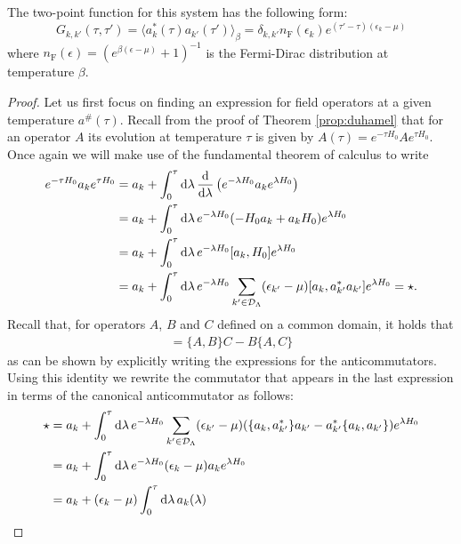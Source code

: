 \begin{lemma}
	\label{two-point-function}
	The two-point function for this system has the following form:
	\begin{equation}
		G_{k,k'}(\tau,\tau')
		= \langle a^*_k(\tau) a_{k'}(\tau') \rangle_\beta
		= \delta_{k,k'} n_{\mathrm{F}}(\epsilon_k) e^{(\tau'-\tau)(\epsilon_{k}-\mu)}
	\end{equation}
	where $n_\mathrm{F}(\epsilon) = (e^{\beta(\epsilon-\mu)}+1)^{-1}$ is the Fermi-Dirac distribution
	at temperature $\beta$.
\end{lemma}
\begin{proof}
	Let us first focus on finding an expression for field operators at a given temperature
	$a^\#(\tau)$. Recall from the proof of Theorem \ref{prop:duhamel} that for an operator $A$
	its evolution at temperature $\tau$ is given by $A(\tau)=e^{-\tau H_0}A e^{\tau H_0}$. Once
	again we will make use of the fundamental theorem of calculus to write
	\begin{align*}
		e^{-\tau H_0}a_k e^{\tau H_0}
		&= a_k + \int_0^\tau \mathrm{d}\lambda\, \frac{\mathrm{d}}{\mathrm{d}\lambda}\left( e^{-\lambda H_0}a_k e^{\lambda H_0} \right) \\
		&= a_k + \int_0^\tau \mathrm{d}\lambda\, e^{-\lambda H_0}(-H_0 a_k + a_k H_0)e^{\lambda H_0} \\
		&= a_k + \int_0^\tau \mathrm{d}\lambda\, e^{-\lambda H_0}[a_k,H_0]e^{\lambda H_0} \\
		&= a_k + \int_0^\tau \mathrm{d}\lambda\, e^{-\lambda H_0}\sum_{k'\in\mathcal{D}_\Lambda}(\epsilon_{k'}-\mu)[a_k,a^*_{k'} a_{k'}]e^{\lambda H_0}
		= \star.
	\end{align*}
	Recall that, for operators $A$, $B$ and $C$ defined on a common domain, it holds that
	\begin{align*}
		[A,BC] = \{A,B\}C - B\{A,C\}
	\end{align*}
	as can be shown by explicitly writing the expressions for the anticommutators. Using this
	identity we rewrite the commutator that appears in the last expression in terms of the
	canonical anticommutator as follows:
	\begin{align*}
		\star
		&= a_k + \int_0^\tau\dx\lambda\, e^{-\lambda H_0}
			\sum_{k'\in\mathcal{D}_\Lambda}(\epsilon_{k'}-\mu)(\{a_k,a^*_{k'}\}a_{k'} - a^*_{k'}\{a_k,a_{k'}\})
			e^{\lambda H_0} \\
		&= a_k + \int_0^\tau\dx\lambda\, e^{-\lambda H_0}(\epsilon_{k}-\mu)a_{k}e^{\lambda H_0} \\
		&= a_k + (\epsilon_k-\mu)\int_0^\tau\dx\lambda\,a_k(\lambda)

\end{align*}
\end{proof}
